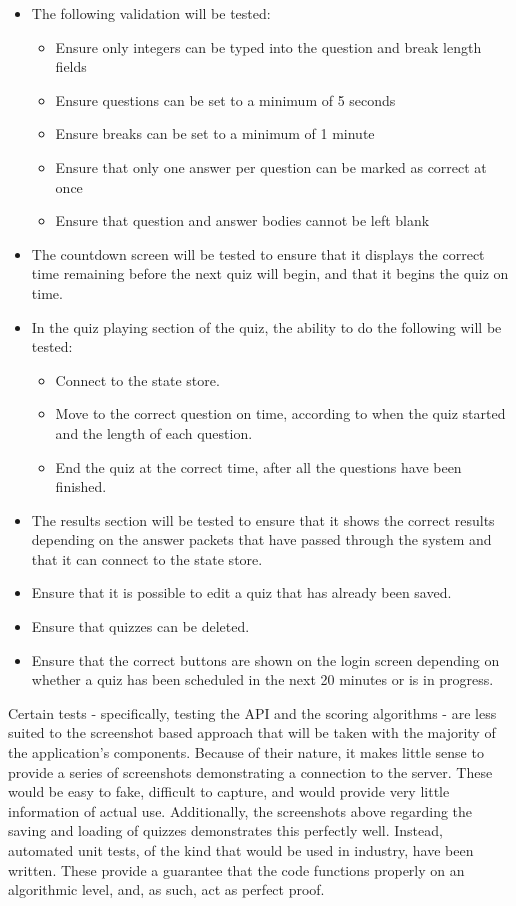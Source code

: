 \begin{itemize}
  \item The following validation will be tested:
  \begin{itemize}
    \item Ensure only integers can be typed into the question and break length fields
    \item Ensure questions can be set to a minimum of 5 seconds
    \item Ensure breaks can be set to a minimum of 1 minute
    \item Ensure that only one answer per question can be marked as correct at once
    \item Ensure that question and answer bodies cannot be left blank
  \end{itemize}

  \item The countdown screen will be tested to ensure that it displays the correct time remaining before the next quiz will begin, and that it begins the quiz on time.

  \item In the quiz playing section of the quiz, the ability to do the following will be tested:
  \begin{itemize}
    \item Connect to the state store.
    \item Move to the correct question on time, according to when the quiz started and the length of each question.
    \item End the quiz at the correct time, after all the questions have been finished.
  \end{itemize}

  \item The results section will be tested to ensure that it shows the correct results depending on the answer packets that have passed through the system and that it can connect to the state store.

  \item Ensure that it is possible to edit a quiz that has already been saved.
  \item Ensure that quizzes can be deleted.
  \item Ensure that the correct buttons are shown on the login screen depending on whether a quiz has been scheduled in the next 20 minutes or is in progress.
\end{itemize}

Certain tests - specifically, testing the API and the scoring algorithms - are less suited to the screenshot based approach that will be taken with the majority of the application's components. Because of their nature, it makes little sense to provide a series of screenshots demonstrating a connection to the server. These would be easy to fake, difficult to capture, and would provide very little information of actual use. Additionally, the screenshots above regarding the saving and loading of quizzes demonstrates this perfectly well. Instead, automated unit tests, of the kind that would be used in industry, have been written. These provide a guarantee that the code functions properly on an algorithmic level, and, as such, act as perfect proof.
